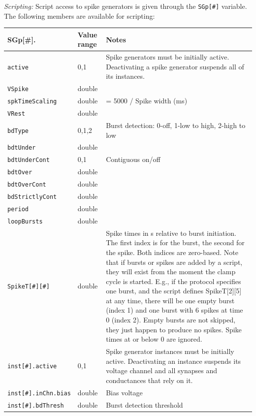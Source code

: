 \documentclass{article}
\begin{document}
\noindent
\emph{Scripting:} Script access to spike generators is given through the \texttt{SGp[\#]} variable.
The following members are available for scripting: \\
\begin{tabularx}{\linewidth}{|ll|X|}
	\hline
	{\bf SGp[\#].\textvisiblespace} & {\bf Value range} & {\bf Notes} \\
	\hline
	\texttt{active} & 0,1 & Spike generators must be initially active. Deactivating a spike generator
	suspends all of	its instances. \\
	\texttt{VSpike} & double & \\
	\texttt{spkTimeScaling} & double & = 5000 / Spike width (ms)\\
	\texttt{VRest} & double & \\
	\texttt{bdType} & 0,1,2 & Burst detection: 0-off, 1-low to high, 2-high to low \\
	\texttt{bdtUnder} & double & \\
	\texttt{bdtUnderCont} & 0,1 & Contiguous on/off \\
	\texttt{bdtOver} & double & \\
	\texttt{bdtOverCont} & double & \\
	\texttt{bdStrictlyCont} & double & \\
	\texttt{period} & double & \\
	\texttt{loopBursts} & double & \\
	\texttt{SpikeT[\#][\#]} & double & Spike times in s relative to burst initiation.
	 The first index is for the burst, the second for the spike. Both indices are zero-based.
	 Note that if bursts or spikes are added by a script, they will exist from the moment the clamp
	 cycle is started. E.g., if the protocol specifies one burst, and the script defines SpikeT[2][5]
	 at any time,
	 there will be one empty burst (index 1) and one burst with 6 spikes at time 0 (index 2). Empty
	 bursts are not skipped, they just happen to produce no spikes. Spike times at or below 0 are ignored. \\
	\texttt{inst[\#].active} & 0,1 & Spike generator instances must be initially active.
	 Deactivating an instance suspends its voltage channel and all synapses and conductances that rely on it. \\
	\texttt{inst[\#].inChn.bias} & double & Bias voltage \\
	\texttt{inst[\#].bdThresh} & double & Burst detection threshold \\
	\hline
\end{tabularx}
\end{document}

